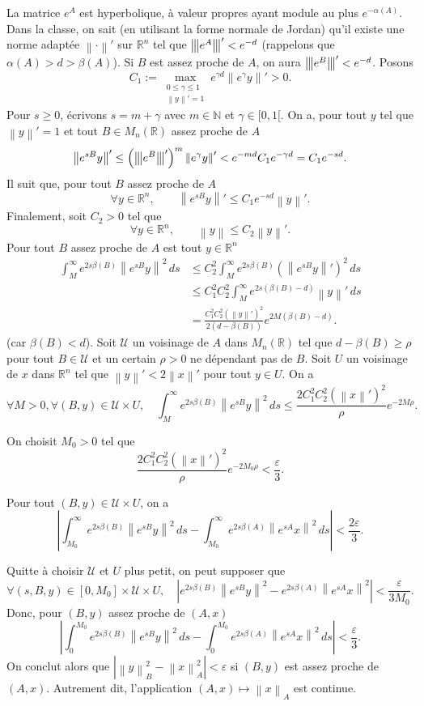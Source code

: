 \documentclass[french]{article}
\theoremstyle{definition}
\newcommand{\tuple}[1]{\left(#1\right)}
\newcommand{\abs}[1]{\left|#1\right|}
\newcommand{\norm}[1]{\left\|#1\right\|}
\newcommand{\triplenorm}[1]{{\left\vert\kern-0.25ex\left\vert\kern-0.25ex\left\vert #1 \right\vert\kern-0.25ex\right\vert\kern-0.25ex\right\vert}}
\newcommand{\Nbb}{\mathbb{N}}
\newcommand{\Rbb}{\mathbb{R}}
\newcommand{\Ucal}{\mathcal{U}}
\begin{document}
\begin{enumerate}
   La matrice $e^{A}$ est hyperbolique, \`a valeur propres ayant module au plus $e^{-\alpha(A)}$. Dans la classe, on sait (en utilisant la forme normale de Jordan) qu'il existe une norme adapt\'ee $\norm{\cdot }'$ sur $\Rbb^n$ tel que $\triplenorm{e^A}' < e^{-d}$ (rappelons que $\alpha(A) > d > \beta(A)$). Si $B$ est assez proche de $A$, on aura $\triplenorm{e^B}' < e^{-d}$. Posons
        $$C_1 := \max_{\substack{0 \le \gamma \le 1 \\ \norm{y}' = 1}}e^{\gamma d}\norm{e^\gamma y}' > 0.$$
    Pour $s \ge 0$, \'ecrivons $s = m + \gamma$ avec $m \in \Nbb$ et $\gamma \in [0,1[$. On a, pour tout $y$ tel que $\norm{y}' = 1$ et tout $B \in M_n(\Rbb)$ assez proche de $A$
        $$\norm{e^{sB}y}' \le \tuple{\triplenorm{e^B}'}^m \norm{e^\gamma y}' < e^{-md}C_1e^{-\gamma d} = C_1e^{-sd}.$$
    Il suit que, pour tout $B$ assez proche de $A$
        $$\forall y \in \Rbb^n, \qquad \norm{e^{sB}y}' \le C_1e^{-sd}\norm{y}'.$$
    Finalement, soit $C_2 > 0$ tel que 
        $$\forall y \in \Rbb^n, \qquad \norm{y} \le C_2\norm{y}'.$$
   Pour tout $B$ assez proche de $A$ est tout $y \in \Rbb^n$
        \begin{align*}
            \int_M^\infty e^{2s\beta(B)} \norm{e^{sB}y}^2 \,ds & \le C_2^2\int_M^\infty e^{2s\beta(B)} \tuple{\norm{e^{sB}y}'}^2 \,ds \\
            & \le C_1^2C_2^2 \int_M^\infty e^{2s(\beta(B) - d)}\norm{y}'\,ds\\
            & = \frac{C_1^2C_2^2 (\norm{y}')^2}{2(d - \beta(B))}e^{2M(\beta(B) - d)}.
        \end{align*}
    (car $\beta(B) < d$). Soit $\Ucal$ un voisinage de $A$ dans $M_n(\Rbb)$ tel que $d - \beta(B) \ge \rho$ pour tout $B \in \Ucal$ et un certain $\rho > 0$ ne d\'ependant pas de $B$. Soit $U$ un voisinage de $x$ dans $\Rbb^n$ tel que $\norm{y}' < 2\norm{x}'$ pour tout $y \in U$. On a
        $$\forall M > 0, \forall (B,y) \in \Ucal \times U, \quad \int_M^\infty e^{2s\beta(B)} \norm{e^{sB}y}^2 \,ds \le \frac{2C_1^2C_2^2 (\norm{x}')^2}{\rho}e^{-2M\rho}.$$
        
    On choisit $M_0 > 0$ tel que
        $$\frac{2C_1^2C_2^2 (\norm{x}')^2}{\rho}e^{-2M_0\rho} < \frac{\varepsilon}{3}.$$
        
    Pour tout $(B,y) \in \Ucal \times U$, on a
        $$\abs{\int_{M_0}^\infty e^{2s\beta(B)} \norm{e^{sB}y}^2 \,ds  - \int_{M_0}^\infty e^{2s\beta(A)} \norm{e^{sA}x}^2 \,ds } < \frac{2\varepsilon}{3}.$$
        
    Quitte \`a choisir $\Ucal$ et $U$ plus petit, on peut supposer que
        $$\forall (s,B,y) \in [0,M_0] \times \Ucal \times U, \quad \abs{e^{2s\beta(B)}\norm{e^{sB}y}^2 - e^{2s\beta(A)}\norm{e^{sA}x}^2} < \frac{\varepsilon}{3M_0}.$$
    Donc, pour $(B,y)$ assez proche de $(A,x)$
        $$\abs{\int_0^{M_0}e^{2s\beta(B)}\norm{e^{sB}y}^2\,ds - \int_0^{M_0}e^{2s\beta(A)}\norm{e^{sA}x}^2 \,ds} < \frac{\varepsilon}{3}.$$
    On conclut alors que $\abs{\norm{y}_B^2 - \norm{x}_A^2} < \varepsilon$ si $(B,y)$ est assez proche de $(A,x)$. Autrement dit, l'application $(A,x) \mapsto \norm{x}_A$ est continue.
    


\end{enumerate}
\end{document}
